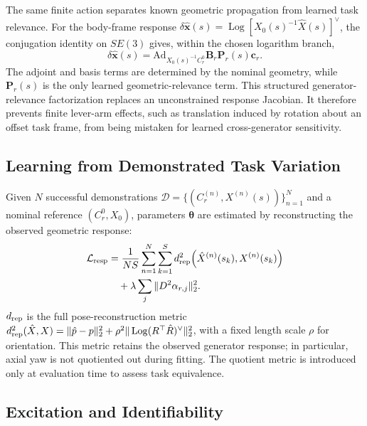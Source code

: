\documentclass[letterpaper,10pt,conference]{ieeeconf}
\DeclareMathOperator{\Log}{Log}
\begin{document}
The same finite action separates known geometric propagation from learned task
relevance. For the body-frame response
$\delta\hat{\bm x}(s)=\Log[X_0(s)^{-1}\hat X(s)]^\vee$, the conjugation identity
on $SE(3)$ gives, within the chosen logarithm branch,
\begin{equation}
    \boxed{
    \delta\hat{\bm x}(s)=
    \mathrm{Ad}_{X_0(s)^{-1}C_r^0}\mathbf B_r\mathbf P_r(s)\bm c_r .
    }
    \label{eq:central_decomposition}
\end{equation}
The adjoint and basis terms are determined by the nominal geometry, while
$\mathbf P_r(s)$ is the only learned geometric-relevance term. This structured
generator-relevance factorization replaces an unconstrained response Jacobian.
It therefore prevents finite lever-arm effects, such as translation induced by
rotation about an offset task frame, from being mistaken for learned
cross-generator sensitivity.

\subsection{Learning from Demonstrated Task Variation}

Given $N$ successful demonstrations
$\mathcal D=\{(C_r^{(n)},X^{(n)}(s))\}_{n=1}^{N}$ and a nominal reference
$(C_r^0,X_0)$, parameters $\bm\theta$ are estimated by reconstructing the
observed geometric response:
\begin{align}
\mathcal L_{\rm resp}
&=
\frac{1}{NS}\sum_{n=1}^{N}\sum_{k=1}^{S}
d_{\rm rep}^{2}\!\left(\hat X^{(n)}(s_k),X^{(n)}(s_k)\right) \nonumber\\
&\quad+\lambda\sum_j\|D^2\alpha_{r,j}\|_2^2 .
\label{eq:loss}
\end{align}
$d_{\rm rep}$ is the full pose-reconstruction metric
$d_{\rm rep}^2(\hat X,X)=\|\hat p-p\|_2^2+
\rho^2\|\Log(R^\top\hat R)^\vee\|_2^2$, with a fixed length scale $\rho$ for
orientation. This metric retains the observed generator response; in particular,
axial yaw is not quotiented out during fitting. The quotient metric is
introduced only at evaluation time to assess task equivalence.

\subsection{Excitation and Identifiability}
\end{document}
